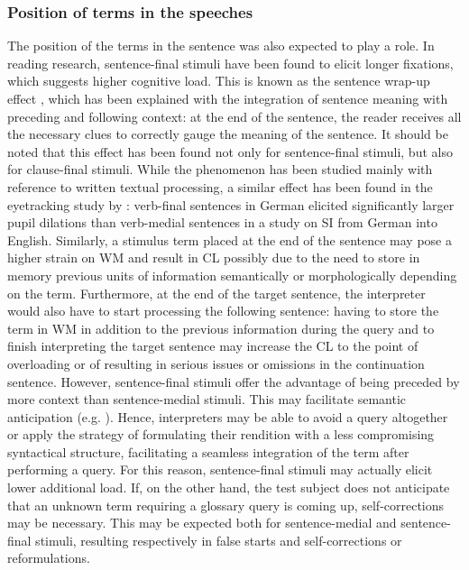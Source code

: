 \subsubsection{Position of terms in the speeches} \label{position}
The position of the terms in the sentence was also expected to play a role. In reading research, sentence-final stimuli have been found to elicit longer fixations, which suggests higher cognitive load. This is known as the sentence wrap-up effect \citep{warren_investigating_2009}, which has been explained with the integration of sentence meaning with preceding and following context: at the end of the sentence, the reader receives all the necessary clues to correctly gauge the meaning of the sentence. It should be noted that this effect has been found not only for sentence-final stimuli, but also for clause-final stimuli. While the phenomenon has been studied mainly with reference to written textual processing, a similar effect has been found in the eyetracking study by \citet{seeber_cognitive_2012}: verb-final sentences in German elicited significantly larger pupil dilations than verb-medial sentences in a study on SI from German into English. Similarly, a stimulus term placed at the end of the sentence may pose a higher strain on WM and result in CL possibly due to the need to store in memory previous units of information semantically or morphologically depending on the term. Furthermore, at the end of the target sentence, the interpreter would also have to start processing the following sentence: having to store the term in WM in addition to the previous information during the query and to finish interpreting the target sentence may increase the CL to the point of overloading or of resulting in serious issues or omissions in the continuation sentence. However, sentence-final stimuli offer the advantage of being preceded by more context than sentence-medial stimuli. This may facilitate semantic anticipation (e.g. \citealt{gile_basic_2009}). Hence, interpreters may be able to avoid a query altogether or apply the strategy of formulating their rendition with a less compromising syntactical structure, facilitating a seamless integration of the term after performing a query. For this reason, sentence-final stimuli may actually elicit lower additional load. If, on the other hand, the test subject does not anticipate that an unknown term requiring a glossary query is coming up, self-corrections may be necessary. This may be expected both for sentence-medial and sentence-final stimuli, resulting respectively in false starts and self-corrections or reformulations.



